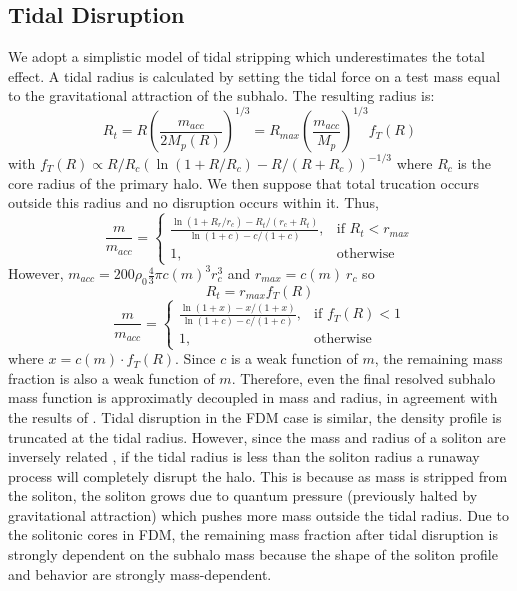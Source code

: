 \documentclass[usenatbib]{mnras}
\begin{document}
\subsection{Tidal Disruption} 
We adopt a simplistic model of tidal stripping which underestimates the total effect. A tidal radius is calculated by setting the tidal force on a test mass equal to the gravitational attraction of the subhalo. The resulting radius is:
\begin{equation}
R_t = R \left(\frac{m_{acc}}{2M_p(R)}\right)^{1/3} =  R_{max} \left(\frac{m_{acc}}{M_p}\right)^{1/3} f_T(R)
\end{equation} 
with $f_T(R) \propto R/R_c(\ln(1+R/R_c) - R/(R+R_c))^{-1/3}$ where $R_c$ is the core radius of the primary halo. We then suppose that total trucation occurs outside this radius and no disruption occurs within it. Thus,
\begin{equation}
\frac{m}{m_{acc}} = 
\begin{cases}
    \frac{\ln{(1+R_r/r_c)} - R_t/(r_c+R_t)}{\ln{(1+c)} - c/(1+c)},& \text{if } R_t < r_{max}\\
    1,              & \text{otherwise}
\end{cases}
\end{equation} 
However, $m_{acc} = 200 \rho_0 \frac{4}{3} \pi c(m)^3 r_c^3$ and $r_{max} = c(m) \: r_{c}$ so 
\begin{equation}
R_t = r_{max} f_T(R)
\end{equation}
\begin{equation} \label{trunc}
 \frac{m}{m_{acc}} = 
\begin{cases}
    \frac{\ln{(1 + x)} - x/(1 + x)}{\ln{(1+c)} - c/(1+c)},& \text{if } f_T(R) < 1\\
    1,              & \text{otherwise}
\end{cases}
\end{equation} where $x = c(m) \cdot f_T(R)$. Since $c$ is a weak function of $m$, the remaining mass fraction is also a weak function of $m$. Therefore, even the final resolved subhalo mass function is approximatly decoupled in mass and radius, in agreement with the results of \citet{unified_model}. Tidal disruption in the FDM case is similar, the density profile is truncated at the tidal radius. However, since the mass and radius of a soliton are inversely related \citep{solitons}, if the tidal radius is less than the soliton radius a runaway process will completely disrupt the halo. This is because as mass is stripped from the soliton, the soliton grows due to quantum pressure (previously halted by gravitational attraction) which pushes more mass outside the tidal radius. Due to the solitonic cores in FDM, the remaining mass fraction after tidal disruption is strongly dependent on the subhalo mass because the shape of the soliton profile and behavior are strongly mass-dependent. 
\end{document}
